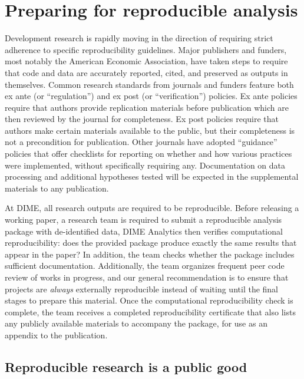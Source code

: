 \section{Preparing for reproducible analysis}


Development research is rapidly moving in the direction of requiring strict adherence
to specific reproducibility guidelines.\cite{christensen2018transparency}
Major publishers and funders, most notably the American Economic Association,
have taken steps to require that code and data
are accurately reported, cited, and preserved as outputs in themselves.
Common research standards from journals and funders feature both ex ante
(or ``regulation'') and ex post (or ``verification'') policies.\cite{stodden2013toward}
Ex ante policies require that authors
provide replication materials before publication
which are then reviewed by the journal for completeness.
Ex post policies require that authors make certain materials available to the public,
but their completeness is not a precondition for publication.
Other journals have adopted ``guidance'' policies that offer checklists
for reporting on whether and how various practices were implemented,
without specifically requiring any.\cite{nosek2015promoting}
Documentation on data processing and additional hypotheses tested
will be expected in the supplemental materials to any publication.

At DIME, all research outputs are required to be reproducible.
Before releasing a working paper,
a research team is required to submit
a reproducible analysis package with de-identified data,
DIME Analytics then verifies computational reproducibility:
does the provided package produce exactly the same results that appear in the paper?
In addition, the team checks whether the package includes sufficient documentation.
Additionally, the team organizes frequent peer code review of works in progress,
and our general recommendation is to ensure that projects
are \textit{always} externally reproducible
instead of waiting until the final stages to prepare this material.
Once the computational reproducibility check is complete, 
the team receives a completed reproducibility certificate
that also lists any publicly available materials to accompany the package,
for use as an appendix to the publication.


\subsection{Reproducible research is a public good}

